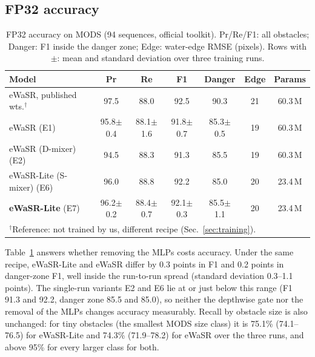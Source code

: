 \documentclass[conference]{IEEEtran}
\newcommand{\pmstd}[2]{#1{\scriptsize$\pm$#2}}
\begin{document}
\subsection{FP32 accuracy}
\label{sec:fp32}
\begin{table}[t]
\centering
\caption{FP32 accuracy on MODS (94 sequences, official toolkit). Pr/Re/F1: all obstacles; Danger: F1 inside the danger zone; Edge: water-edge RMSE (pixels). Rows with $\pm$: mean and standard deviation over three training runs.}
\label{tab:fp32}
\setlength{\tabcolsep}{2.6pt}
\begin{tabular}{lcccccc}
\toprule
Model & Pr & Re & F1 & Danger & Edge & Params \\
\midrule
eWaSR, published wts.$^\dagger$ & 97.5 & 88.0 & 92.5 & 90.3 & 21 & 60.3\,M \\
\midrule
eWaSR (E1)                & \pmstd{95.8}{0.4} & \pmstd{88.1}{1.6} & \pmstd{91.8}{0.7} & \pmstd{85.3}{0.5} & 19 & 60.3\,M \\
eWaSR (D-mixer) (E2)      & 94.5 & 88.3 & 91.3 & 85.5 & 19 & 60.3\,M \\
eWaSR-Lite (S-mixer) (E6) & 96.0 & 88.8 & 92.2 & 85.0 & 20 & 23.4\,M \\
\textbf{eWaSR-Lite} (E7)  & \pmstd{96.2}{0.2} & \pmstd{88.4}{0.7} & \pmstd{92.1}{0.3} & \pmstd{85.5}{1.1} & 20 & 23.4\,M \\
\bottomrule
\multicolumn{7}{l}{\footnotesize $^\dagger$Reference: not trained by us, different recipe (Sec.~\ref{sec:training}).}
\end{tabular}
\end{table}

Table~\ref{tab:fp32} answers whether removing the MLPs costs accuracy. Under the same recipe, eWaSR-Lite and eWaSR differ by 0.3 points in F1 and 0.2 points in danger-zone F1, well inside the run-to-run spread (standard deviation 0.3--1.1 points). The single-run variants E2 and E6 lie at or just below this range (F1 91.3 and 92.2, danger zone 85.5 and 85.0), so neither the depthwise gate nor the removal of the MLPs changes accuracy measurably. Recall by obstacle size is also unchanged: for tiny obstacles (the smallest MODS size class) it is 75.1\% (74.1--76.5) for eWaSR-Lite and 74.3\% (71.9--78.2) for eWaSR over the three runs, and above 95\% for every larger class for both.
\end{document}
